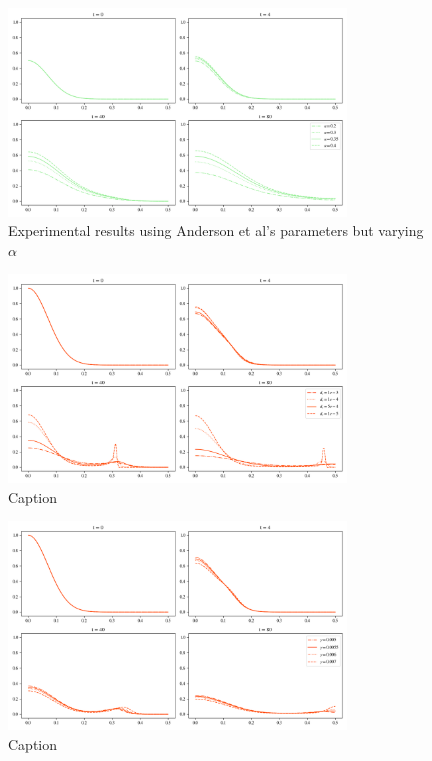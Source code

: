 \begin{figure}[h]
    \centering
    \includegraphics[width=0.8\textwidth]{resources/images/alpha_comparison.png}
    \caption{Experimental results using Anderson et al's parameters but varying $\alpha$ }
    \label{fig:replication_alpha_comparison}
\end{figure}

\begin{figure}[h]
    \centering
    \includegraphics[width=0.8\textwidth]{resources/images/dc_comparison.png}
    \caption{Caption}
    \label{fig:replication_dc_comparison}
\end{figure}

\begin{figure}[h]
    \centering
    \includegraphics[width=0.8\textwidth]{resources/images/gamma_comparison.png}
    \caption{Caption}
    \label{fig:replication_gamma_comparison}
\end{figure}



